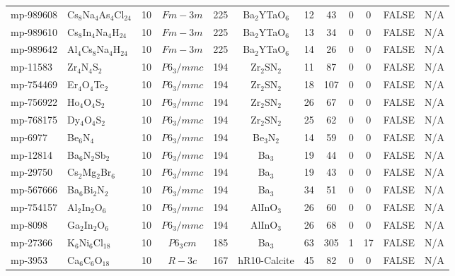 {\begin{longtable}{llcccccccccc}
    mp-989608 & Cs$_{8}$Na$_{4}$As$_{4}$Cl$_{24}$ & 10    & $Fm-3m$ & 225   & Ba$_{2}$YTaO$_{6}$ & 12    & 43    & 0     & 0     & FALSE & N/A \\
    mp-989610 & Cs$_{8}$In$_{4}$Na$_{4}$H$_{24}$ & 10    & $Fm-3m$ & 225   & Ba$_{2}$YTaO$_{6}$ & 13    & 34    & 0     & 0     & FALSE & N/A \\
    mp-989642 & Al$_{4}$Cs$_{8}$Na$_{4}$H$_{24}$ & 10    & $Fm-3m$ & 225   & Ba$_{2}$YTaO$_{6}$ & 14    & 26    & 0     & 0     & FALSE & N/A \\
    mp-11583 & Zr$_{4}$N$_{4}$S$_{2}$ & 10    & $P6_3/mmc$ & 194   & Zr$_{2}$SN$_{2}$ & 11    & 87    & 0     & 0     & FALSE & N/A \\
    mp-754469 & Er$_{4}$O$_{4}$Te$_{2}$ & 10    & $P6_3/mmc$ & 194   & Zr$_{2}$SN$_{2}$ & 18    & 107   & 0     & 0     & FALSE & N/A \\
    mp-756922 & Ho$_{4}$O$_{4}$S$_{2}$ & 10    & $P6_3/mmc$ & 194   & Zr$_{2}$SN$_{2}$ & 26    & 67    & 0     & 0     & FALSE & N/A \\
    mp-768175 & Dy$_{4}$O$_{4}$S$_{2}$ & 10    & $P6_3/mmc$ & 194   & Zr$_{2}$SN$_{2}$ & 25    & 62    & 0     & 0     & FALSE & N/A \\
    mp-6977 & Be$_{6}$N$_{4}$ & 10    & $P6_3/mmc$ & 194   & Be$_{3}$N$_{2}$ & 14    & 59    & 0     & 0     & FALSE & N/A \\
    mp-12814 & Ba$_{6}$N$_{2}$Sb$_{2}$ & 10    & $P6_3/mmc$ & 194   & Ba$_{3}$ & 19    & 44    & 0     & 0     & FALSE & N/A \\
    mp-29750 & Cs$_{2}$Mg$_{2}$Br$_{6}$ & 10    & $P6_3/mmc$ & 194   & Ba$_{3}$ & 19    & 43    & 0     & 0     & FALSE & N/A \\
    mp-567666 & Ba$_{6}$Bi$_{2}$N$_{2}$ & 10    & $P6_3/mmc$ & 194   & Ba$_{3}$ & 34    & 51    & 0     & 0     & FALSE & N/A \\
    mp-754157 & Al$_{2}$In$_{2}$O$_{6}$ & 10    & $P6_3/mmc$ & 194   & AlInO$_{3}$ & 26    & 60    & 0     & 0     & FALSE & N/A \\
    mp-8098 & Ga$_{2}$In$_{2}$O$_{6}$ & 10    & $P6_3/mmc$ & 194   & AlInO$_{3}$ & 26    & 68    & 0     & 0     & FALSE & N/A \\
    mp-27366 & K$_{6}$Ni$_{6}$Cl$_{18}$ & 10    & $P6_3cm$ & 185   & Ba$_{3}$ & 63    & 305   & 1     & 17    & FALSE & N/A \\
    mp-3953 & Ca$_{6}$C$_{6}$O$_{18}$ & 10    & $R-3c$ & 167   & hR10-Calcite & 45    & 82    & 0     & 0     & FALSE & N/A \\

\end{longtable}}
